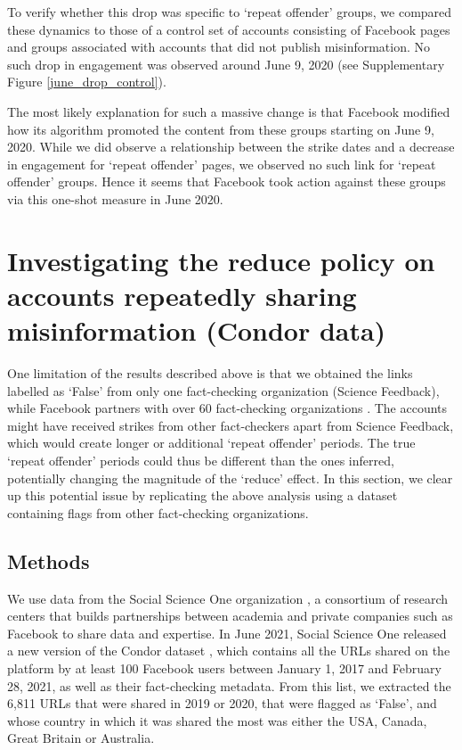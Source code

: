 \documentclass[review]{elsarticle}
\begin{document}
To verify whether this drop was specific to `repeat offender' groups, we compared these dynamics to those of a control set of accounts consisting of Facebook pages and groups associated with accounts that did not publish misinformation.
No such drop in engagement was observed around June 9, 2020 (see Supplementary Figure \ref{june_drop_control}).

The most likely explanation for such a massive change is that Facebook modified how its algorithm promoted the content from these groups starting on June 9, 2020.
While we did observe a relationship between the strike dates and a decrease in engagement for `repeat offender' pages, we observed no such link for `repeat offender' groups.
Hence it seems that Facebook took action against these groups via this one-shot measure in June 2020.

\section{Investigating the reduce policy on accounts repeatedly sharing misinformation (Condor data)}

One limitation of the results described above is that we obtained the links labelled as `False' from only one fact-checking organization (Science Feedback), while Facebook partners with over 60 fact-checking organizations \citep{60factCheckingPartners}.
The accounts might have received strikes from other fact-checkers apart from Science Feedback, which would create longer or additional `repeat offender' periods. 
The true `repeat offender' periods could thus be different than the ones inferred, potentially changing the magnitude of the ‘reduce’ effect. 
In this section, we clear up this potential issue by replicating the above analysis using a dataset containing flags from other fact-checking organizations.

\subsection{Methods}

We use data from the Social Science One organization \cite{king2020new}, a consortium of research centers that builds partnerships between academia and private companies such as Facebook to share data and expertise.
In June 2021, Social Science One released a new version of the Condor dataset \cite{messing2020facebook}, which contains all the URLs shared on the platform by at least 100 Facebook users between January 1, 2017 and February 28, 2021, as well as their fact-checking metadata.
From this list, we extracted the 6,811 URLs that were shared in 2019 or 2020, that were flagged as `False', and whose country in which it was shared the most was either the USA, Canada, Great Britain or Australia.
\end{document}
